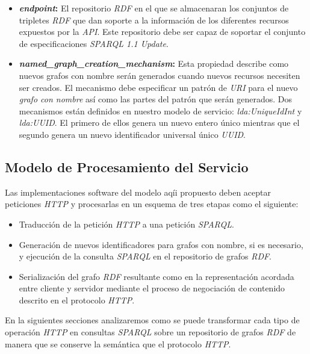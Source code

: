 \begin{itemize}
\item \textbf{\textit{endpoint}:} El repositorio \textit{RDF} en el que se almacenaran los conjuntos de tripletes \textit{RDF} que dan soporte a la informaci\'on de los diferentes recursos expuestos por la \textit{API}. Este repositorio debe ser capaz de soportar el conjunto de especificaciones \textit{SPARQL 1.1 Update}.
\item \textbf{\textit{named\_graph\_creation\_mechanism}:} Esta propiedad describe como nuevos grafos con nombre ser\'an generados cuando nuevos recursos necesiten ser creados. El mecanismo debe especificar un patr\'on de \textit{URI} para el nuevo \textit{grafo con nombre} as\'i como las partes del patr\'on que ser\'an generados. Dos mecanismos est\'an definidos en nuestro modelo de servicio: \textit{lda:UniqueIdInt} y \textit{lda:UUID}. El primero de ellos genera un nuevo entero \'unico mientras que el segundo genera un nuevo identificador universal \'unico \textit{UUID}.
\end{itemize}

\subsection{Modelo de Procesamiento del Servicio}

Las implementaciones software del modelo aq\'ii propuesto deben aceptar peticiones \textit{HTTP} y procesarlas en un esquema de tres etapas como el siguiente:\

\begin{itemize}
\item Traducci\'on de la petici\'on \textit{HTTP} a una petici\'on \textit{SPARQL}.
\item Generaci\'on de nuevos identificadores para grafos con nombre, si es necesario, y ejecuci\'on de la consulta \textit{SPARQL} en el repositorio de grafos \textit{RDF}.
\item Serializaci\'on del grafo \textit{RDF} resultante como en la representaci\'on acordada entre cliente y servidor mediante el proceso de negociaci\'on de contenido descrito en el protocolo \textit{HTTP}.
\end{itemize}

En la siguientes secciones analizaremos como se puede transformar cada tipo de operaci\'on \textit{HTTP} en consultas \textit{SPARQL} sobre un repositorio de grafos \textit{RDF} de manera que se conserve la sem\'antica que el protocolo \textit{HTTP}.

